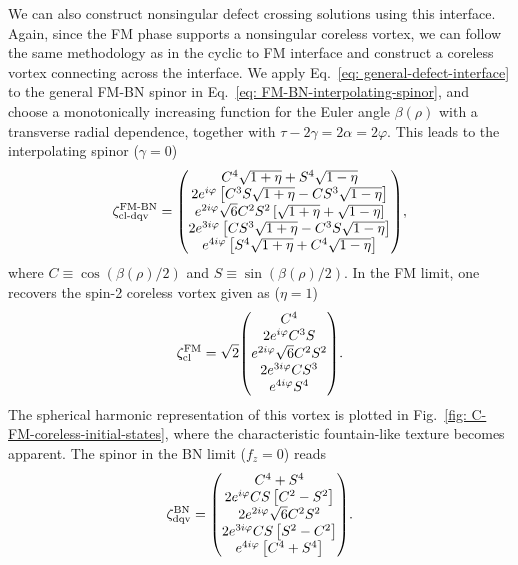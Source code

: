 We can also construct nonsingular defect crossing solutions using this interface.
Again, since the FM phase supports a nonsingular coreless vortex, we can follow
the same methodology as in the cyclic to FM interface and construct a coreless
vortex connecting across the interface.
We apply Eq.~\eqref{eq: general-defect-interface} to the general FM-BN spinor
in Eq.~\eqref{eq: FM-BN-interpolating-spinor}, and choose a monotonically
increasing function for the Euler angle \(\beta(\rho)\) with a transverse
radial dependence, together with \(\tau - 2\gamma = 2\alpha = 2\varphi \).
This leads to the interpolating spinor
(\(\gamma=0\))
\begin{align}\label{eq: FM-BN-coreless-dqv}
    \zeta^\text{FM-BN}_\text{cl-dqv} = \mqty(
    C^4\sqrt{1+\eta} + S^4\sqrt{1-\eta} \\
    2e^{i\varphi}\left[C^3S\sqrt{1+\eta}
        - CS^3\sqrt{1-\eta}\right] \\
    e^{2i\varphi}\sqrt{6}C^2S^2\left[\sqrt{1+\eta}
        + \sqrt{1-\eta} \right] \\
    2e^{3i\varphi}\left[CS^3\sqrt{1+\eta}
        - C^3S\sqrt{1-\eta}\right] \\
    e^{4i\varphi}\left[S^4\sqrt{1+\eta} + C^4\sqrt{1-\eta} \right]
    ),
\end{align}
where \(C \equiv \cos(\beta(\rho)/2)\) and \(S \equiv \sin(\beta(\rho)/2)\).
In the FM limit, one recovers the spin-2 coreless vortex given as (\(\eta=1\))
\begin{align}\label{eq: FM-BN-coreless}
    \zeta^\text{FM}_\text{cl} = \sqrt{2}\mqty(C^4 \\ 2e^{i\varphi}C^3S \\
    e^{2i\varphi}\sqrt{6}C^2S^2 \\ 2e^{3i\varphi}CS^3 \\ e^{4i\varphi}S^4
    ).
\end{align}
The spherical harmonic representation of this vortex is plotted in
Fig.~\ref{fig: C-FM-coreless-initial-states}, where the characteristic
fountain-like texture becomes apparent.
The spinor in the BN limit (\(f_z=0\)) reads
\begin{align}\label{eq: FM-BN-DQV}
    \zeta^\text{BN}_\text{dqv} = \mqty(
    C^4 + S^4 \\
    2e^{i\varphi}CS\left[C^2-S^2\right] \\
    2e^{2i\varphi}\sqrt{6}C^2S^2 \\
    2e^{3i\varphi}CS\left[S^2 - C^2\right] \\
    e^{4i\varphi}\left[C^4 + S^4\right]).
\end{align}

